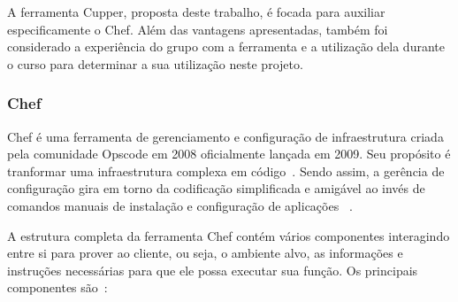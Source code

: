 A ferramenta Cupper, proposta deste trabalho, é focada para auxiliar especificamente
o Chef. Além das vantagens apresentadas, também foi considerado a experiência do grupo
com a ferramenta e a utilização dela durante o curso para determinar a sua utilização
neste projeto. %

\subsubsection{Chef}
\label{sec:chef}

Chef é uma ferramenta de gerenciamento e configuração de infraestrutura criada
pela comunidade Opscode em 2008 oficialmente lançada em 2009. Seu propósito é
tranformar uma infraestrutura complexa em código~\cite{chef:2016}. Sendo assim, a gerência de
configuração gira em torno da codificação simplificada e amigável
ao invés de comandos manuais de instalação e configuração de aplicações ~\cite{sharma:2015}.

A estrutura completa da ferramenta Chef contém vários componentes interagindo entre si para
prover ao cliente, ou seja, o ambiente alvo, as informações e instruções necessárias para que ele
possa executar sua função. Os principais componentes são~\cite{chefdoc:2016}:

